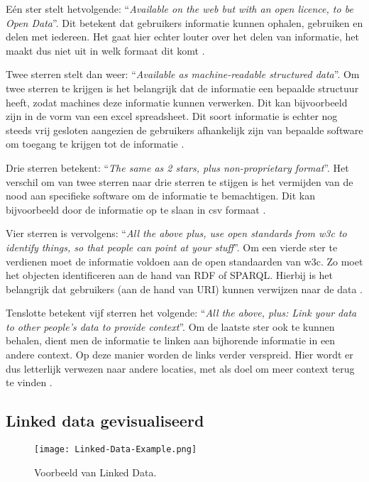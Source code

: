 Eén ster stelt hetvolgende: ``\textit{Available on the web but with an open licence, to be Open Data}''. Dit betekent dat gebruikers informatie kunnen ophalen, gebruiken en delen met iedereen. Het gaat hier echter louter over het delen van informatie, het maakt dus niet uit in welk formaat dit komt \cite{berners2006linkeddata}. 

Twee sterren stelt dan weer: ``\textit{Available as machine-readable structured data}''. Om twee sterren te krijgen is het belangrijk dat de informatie een bepaalde structuur heeft, zodat machines deze informatie kunnen verwerken. Dit kan bijvoorbeeld zijn in de vorm van een excel spreadsheet. Dit soort informatie is echter nog steeds vrij gesloten aangezien de gebruikers afhankelijk zijn van bepaalde software om toegang te krijgen tot de informatie \cite{berners2006linkeddata}.

Drie sterren betekent: ``\textit{The same as 2 stars, plus non-proprietary format}''. Het verschil om van twee sterren naar drie sterren te stijgen is het vermijden van de nood aan specifieke software om de informatie te bemachtigen. Dit kan bijvoorbeeld door de informatie op te slaan in \acrfull{csv} formaat \cite{berners2006linkeddata}.

Vier sterren is vervolgens: ``\textit{All the above plus, use open standards from \acrshort{w3c} to identify things, so that people can point at your stuff}''. Om een vierde ster te verdienen moet de informatie voldoen aan de open standaarden van \acrshort{w3c}. Zo moet het objecten identificeren aan de hand van RDF of SPARQL. Hierbij is het belangrijk dat gebruikers (aan de hand van URI) kunnen verwijzen naar de data \cite{berners2006linkeddata}.

Tenslotte betekent vijf sterren het volgende: ``\textit{All the above, plus: Link your data to other people’s data to provide context}''. Om de laatste ster ook te kunnen behalen, dient men de informatie te linken aan bijhorende informatie in een andere context. Op deze manier worden de links verder verspreid. Hier wordt er dus letterlijk verwezen naar andere locaties, met als doel om meer context terug te vinden \cite{berners2006linkeddata}.

\subsection{Linked data gevisualiseerd}

\begin{figure}[ht!]
    \centering
    \texttt{[image: Linked-Data-Example.png]}
    \caption{Voorbeeld van Linked Data.}
    \label{fig:linked_data_example}
\end{figure}

